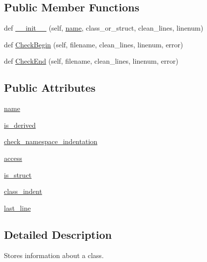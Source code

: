 \subsection*{Public Member Functions}
\begin{DoxyCompactItemize}
\item 
def \hyperlink{classcpplint_1_1__ClassInfo_a549b13e77acbe712f79a2d2b2c98ff7d}{\+\_\+\+\_\+init\+\_\+\+\_\+} (self, \hyperlink{classcpplint_1_1__ClassInfo_a3de5f207d3449d735d15ebca779fe336}{name}, class\+\_\+or\+\_\+struct, clean\+\_\+lines, linenum)
\item 
def \hyperlink{classcpplint_1_1__ClassInfo_abed47237f2e7416ca51cb220cfad6c1b}{Check\+Begin} (self, filename, clean\+\_\+lines, linenum, error)
\item 
def \hyperlink{classcpplint_1_1__ClassInfo_a8a61461a72928bc6ce62a9b75b770fec}{Check\+End} (self, filename, clean\+\_\+lines, linenum, error)
\end{DoxyCompactItemize}
\subsection*{Public Attributes}
\begin{DoxyCompactItemize}
\item 
\hyperlink{classcpplint_1_1__ClassInfo_a3de5f207d3449d735d15ebca779fe336}{name}
\item 
\hyperlink{classcpplint_1_1__ClassInfo_a8cace481686fbbb35a1da552646aa9f4}{is\+\_\+derived}
\item 
\hyperlink{classcpplint_1_1__ClassInfo_a0ead95c17ac0b293d0d371eb7b414bd9}{check\+\_\+namespace\+\_\+indentation}
\item 
\hyperlink{classcpplint_1_1__ClassInfo_aef1251c699b50c6603ce38ca8cce414c}{access}
\item 
\hyperlink{classcpplint_1_1__ClassInfo_a57b443f42838d73183921d661b6fe4ef}{is\+\_\+struct}
\item 
\hyperlink{classcpplint_1_1__ClassInfo_adc7d328734cc58fe46a3a3f323a09f4a}{class\+\_\+indent}
\item 
\hyperlink{classcpplint_1_1__ClassInfo_a72e0f4576cdcb6f3886ed52e2affbc75}{last\+\_\+line}
\end{DoxyCompactItemize}


\subsection{Detailed Description}
\begin{DoxyVerb}Stores information about a class.\end{DoxyVerb}
 

